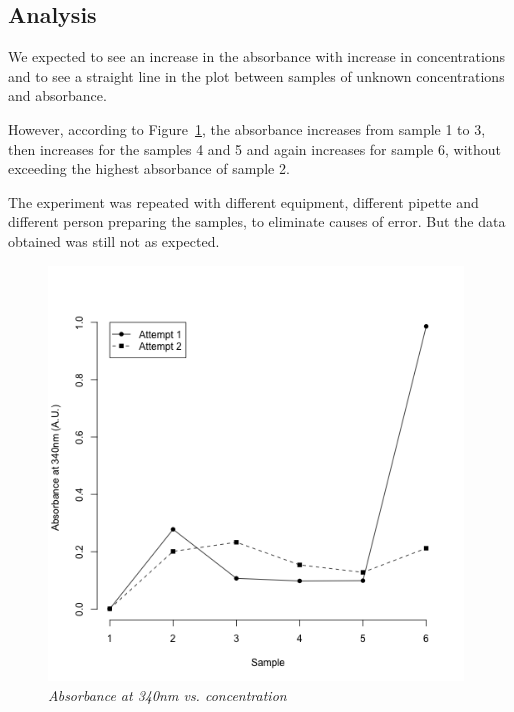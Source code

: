\documentclass[a4paper,10pt]{article}
\begin{document}
        \subsection*{Analysis}
            \begin{minipage}{0.49\textwidth}
                \vspace{-2em}
                We expected to see an increase in the absorbance with increase in concentrations and 
                to see a straight line in the plot between samples of unknown concentrations and absorbance.
                
                However, according to Figure~\ref{fig:abs_340}, the absorbance increases from sample 1 to 3, 
                then increases for the samples 4 and 5 and again increases for sample 6, 
                without exceeding the highest absorbance of sample 2. 

                The experiment was repeated with different equipment, different pipette and different
                person preparing the samples, to eliminate causes of error. But the data obtained 
                was still not as expected.
            \end{minipage}
            \hspace{0.01\textwidth}
            \begin{minipage}{0.49\textwidth}
                \begin{figure}[H]
                    \centering
                    \caption{\it Absorbance at 340nm vs. concentration}\label{fig:abs_340}
                    \includegraphics[width=0.98\textwidth]{../resources/absorption_340.png}
                \end{figure}
            \end{minipage}\\
\end{document}
